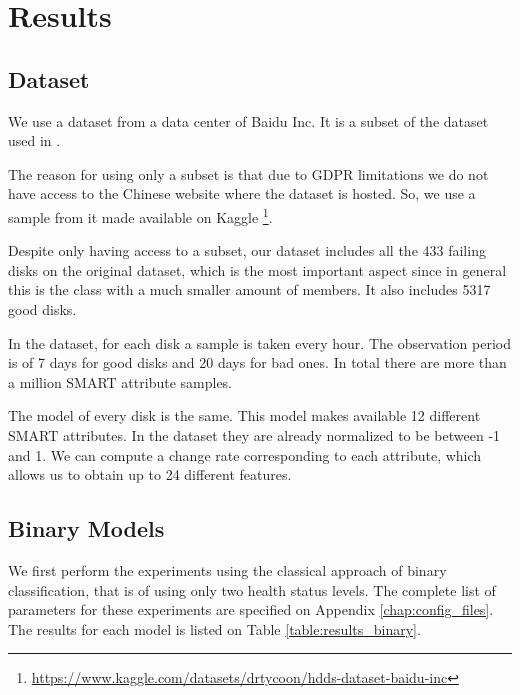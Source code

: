 \chapter{Results}\label{chap:results}

\section{Dataset}

We use a dataset from a data center of Baidu Inc.
It is a subset of the dataset used in \cite{Zhu13}.

The reason for using only a subset is that due to GDPR limitations we do not have access to the Chinese website where the dataset is hosted.
So, we use a sample from it made available on Kaggle \footnote{\url{https://www.kaggle.com/datasets/drtycoon/hdds-dataset-baidu-inc}}.

Despite only having access to a subset, our dataset includes all the 433 failing disks on the original dataset, which is the most important aspect since in general this is the class with a much smaller amount of members.
It also includes 5317 good disks.

In the dataset, for each disk a sample is taken every hour.
The observation period is of 7 days for good disks and 20 days for bad ones.
In total there are more than a million SMART attribute samples.

The model of every disk is the same.
This model makes available 12 different SMART attributes.
In the dataset they are already normalized to be between -1 and 1.
We can compute a change rate corresponding to each attribute, which allows us to obtain up to 24 different features.

\section{Binary Models}

We first perform the experiments using the classical approach of binary classification, that is of using only two health status levels.
The complete list of parameters for these experiments are specified on Appendix \ref{chap:config_files}.
The results for each model is listed on Table \ref{table:results_binary}.

